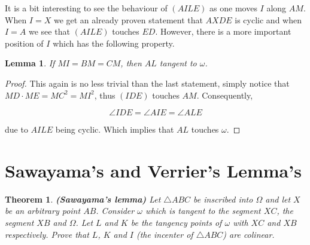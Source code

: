\documentclass{article}
\newtheorem{theorem}{Theorem}
\newtheorem{lemma}{Lemma}
\begin{document}
It is a bit interesting to see the behaviour of \((AILE)\) as one moves \(I\) along \(AM\). When \(I = X\) we get an already proven statement that \(AXDE\) is cyclic and when \(I = A\) we see that \((AILE)\) touches \(ED\). However, there is a more important position of \(I\) which has the following property.

\begin{lemma}
If \(MI = BM = CM\), then \(AL\) tangent to \(\omega\).
\end{lemma}
\begin{proof}
This again is no less trivial than the last statement, simply notice that \(MD \cdot ME = MC^2 = MI^2\), thus \((IDE)\) touches \(AM\). Consequently,

\begin{equation}
\angle{IDE} = \angle{AIE} = \angle{ALE}
\end{equation}

due to \(AILE\) being cyclic. Which implies that \(AL\) touches \(\omega\).
\end{proof}

\section{Sawayama's and Verrier's Lemma's}

\begin{theorem} \textbf{(Sawayama's lemma)}
Let \(\triangle ABC\) be inscribed into \(\Omega\) and let \(X\) be an arbitrary point \(AB\). Consider \(\omega\) which is tangent to the segment \(XC\), the segment \(XB\) and \(\Omega\). Let \(L\) and \(K\) be the tangency points of \(\omega\) with \(XC\) and \(XB\) respectively. Prove that \(L\), \(K\) and \(I\) (the incenter of \(\triangle ABC\)) are colinear.
\end{theorem}
\end{document}
